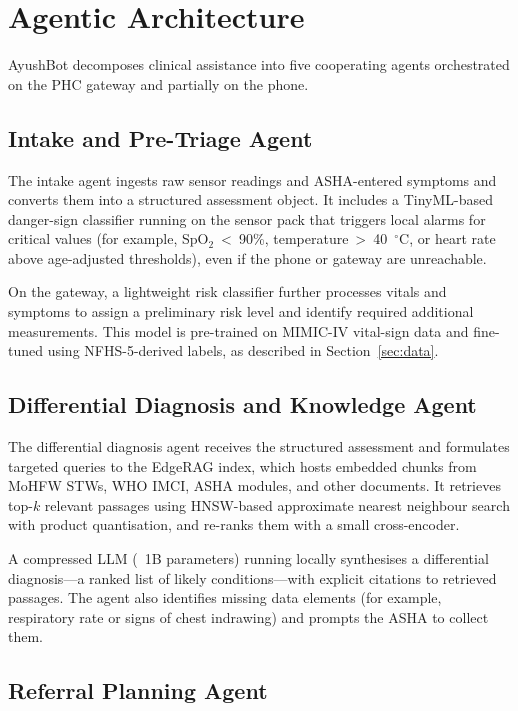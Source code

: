 \documentclass[conference]{IEEEtran}
\begin{document}
\section{Agentic Architecture}

AyushBot decomposes clinical assistance into five cooperating agents orchestrated on the PHC gateway and partially on the phone.

\subsection{Intake and Pre-Triage Agent}

The intake agent ingests raw sensor readings and ASHA-entered symptoms and converts them into a structured assessment object. It includes a TinyML-based danger-sign classifier running on the sensor pack that triggers local alarms for critical values (for example, SpO$_2$~<~90\%, temperature~>~40~$^\circ$C, or heart rate above age-adjusted thresholds), even if the phone or gateway are unreachable.

On the gateway, a lightweight risk classifier further processes vitals and symptoms to assign a preliminary risk level and identify required additional measurements. This model is pre-trained on MIMIC-IV vital-sign data and fine-tuned using NFHS-5-derived labels, as described in Section~\ref{sec:data}.

\subsection{Differential Diagnosis and Knowledge Agent}

The differential diagnosis agent receives the structured assessment and formulates targeted queries to the EdgeRAG index, which hosts embedded chunks from MoHFW STWs, WHO IMCI, ASHA modules, and other documents. It retrieves top-$k$ relevant passages using HNSW-based approximate nearest neighbour search with product quantisation, and re-ranks them with a small cross-encoder.

A compressed LLM (~1B parameters) running locally synthesises a differential diagnosis---a ranked list of likely conditions---with explicit citations to retrieved passages. The agent also identifies missing data elements (for example, respiratory rate or signs of chest indrawing) and prompts the ASHA to collect them.

\subsection{Referral Planning Agent}
\end{document}
